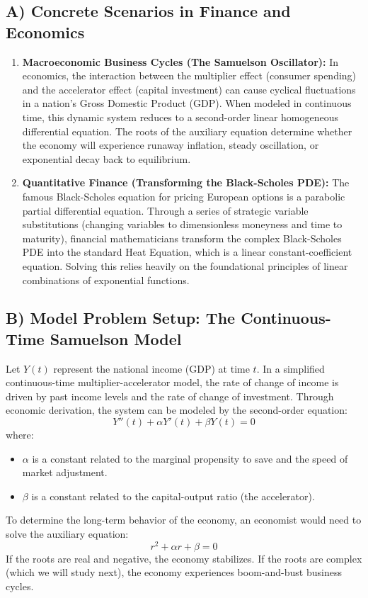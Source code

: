 \documentclass[12pt]{article}
\begin{document}
\subsection{A) Concrete Scenarios in Finance and Economics}
\begin{enumerate}
    \item \textbf{Macroeconomic Business Cycles (The Samuelson Oscillator):} In economics, the interaction between the multiplier effect (consumer spending) and the accelerator effect (capital investment) can cause cyclical fluctuations in a nation's Gross Domestic Product (GDP). When modeled in continuous time, this dynamic system reduces to a second-order linear homogeneous differential equation. The roots of the auxiliary equation determine whether the economy will experience runaway inflation, steady oscillation, or exponential decay back to equilibrium.
    \item \textbf{Quantitative Finance (Transforming the Black-Scholes PDE):} The famous Black-Scholes equation for pricing European options is a parabolic partial differential equation. Through a series of strategic variable substitutions (changing variables to dimensionless moneyness and time to maturity), financial mathematicians transform the complex Black-Scholes PDE into the standard Heat Equation, which is a linear constant-coefficient equation. Solving this relies heavily on the foundational principles of linear combinations of exponential functions.
\end{enumerate}

\subsection{B) Model Problem Setup: The Continuous-Time Samuelson Model}
Let $Y(t)$ represent the national income (GDP) at time $t$. In a simplified continuous-time multiplier-accelerator model, the rate of change of income is driven by past income levels and the rate of change of investment. 
Through economic derivation, the system can be modeled by the second-order equation:
\[ Y''(t) + \alpha Y'(t) + \beta Y(t) = 0 \]
where:
\begin{itemize}
    \item $\alpha$ is a constant related to the marginal propensity to save and the speed of market adjustment.
    \item $\beta$ is a constant related to the capital-output ratio (the accelerator).
\end{itemize}
To determine the long-term behavior of the economy, an economist would need to solve the auxiliary equation:
\[ r^2 + \alpha r + \beta = 0 \]
If the roots are real and negative, the economy stabilizes. If the roots are complex (which we will study next), the economy experiences boom-and-bust business cycles.
\end{document}
